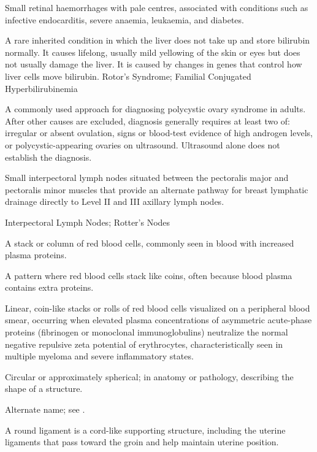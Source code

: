  Small retinal haemorrhages with pale centres, associated with conditions such as infective endocarditis, severe anaemia, leukaemia, and diabetes.

 A rare inherited condition in which the liver does not take
up and store bilirubin normally. It causes lifelong, usually mild yellowing of the
skin or eyes but does not usually damage the liver. It is caused by changes in genes
that control how liver cells move bilirubin.
\synonyms
Rotor's Syndrome; Familial Conjugated Hyperbilirubinemia

 A commonly used approach for diagnosing polycystic ovary syndrome in adults. After other causes are excluded, diagnosis generally requires at least two of: irregular or absent ovulation, signs or blood-test evidence of high androgen levels, or polycystic-appearing ovaries on ultrasound. Ultrasound alone does not establish the diagnosis.

 Small interpectoral lymph nodes situated between the pectoralis major and pectoralis minor muscles that provide an alternate pathway for breast lymphatic drainage directly to Level II and III axillary lymph nodes.

\synonyms
Interpectoral Lymph Nodes; Rotter's Nodes

 A stack or column of red blood cells, commonly seen in blood with increased plasma
proteins.

 A pattern where red blood cells stack like coins, often because blood plasma contains extra proteins.

 Linear, coin-like stacks or rolls of red blood cells visualized on a peripheral blood smear, occurring when elevated plasma concentrations of asymmetric acute-phase proteins (fibrinogen or monoclonal immunoglobulins) neutralize the normal negative repulsive zeta potential of erythrocytes, characteristically seen in multiple myeloma and severe inflammatory states.

 Circular or approximately spherical; in anatomy or pathology, describing the shape of a structure.

 Alternate name; see .

 A round ligament is a cord-like supporting structure, including the uterine ligaments that pass toward the groin and help maintain uterine position.

